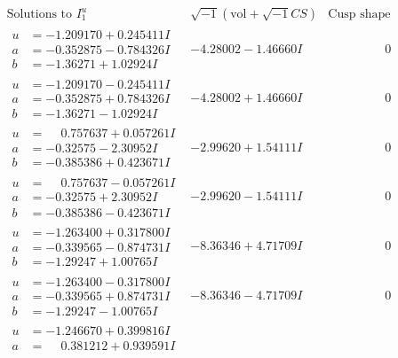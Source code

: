 \documentclass[1p]{elsarticle_modified}
\theoremstyle{definition}
\newcommand{\I}{\sqrt{-1}}
\begin{document}
$$\begin{array}{c|c|c}
\text{Solutions to }I^u_{1}& \I (\text{vol} + \sqrt{-1}CS) & \text{Cusp shape}\\
 \hline 
\begin{aligned}
u &= -1.209170 + 0.245411 I \\
a &= -0.352875 - 0.784326 I \\
b &= -1.36271 + 1.02924 I\end{aligned}
 & -4.28002 - 1.46660 I & \phantom{-0.000000 } 0 \\ \hline\begin{aligned}
u &= -1.209170 - 0.245411 I \\
a &= -0.352875 + 0.784326 I \\
b &= -1.36271 - 1.02924 I\end{aligned}
 & -4.28002 + 1.46660 I & \phantom{-0.000000 } 0 \\ \hline\begin{aligned}
u &= \phantom{-}0.757637 + 0.057261 I \\
a &= -0.32575 - 2.30952 I \\
b &= -0.385386 + 0.423671 I\end{aligned}
 & -2.99620 + 1.54111 I & \phantom{-0.000000 } 0 \\ \hline\begin{aligned}
u &= \phantom{-}0.757637 - 0.057261 I \\
a &= -0.32575 + 2.30952 I \\
b &= -0.385386 - 0.423671 I\end{aligned}
 & -2.99620 - 1.54111 I & \phantom{-0.000000 } 0 \\ \hline\begin{aligned}
u &= -1.263400 + 0.317800 I \\
a &= -0.339565 - 0.874731 I \\
b &= -1.29247 + 1.00765 I\end{aligned}
 & -8.36346 + 4.71709 I & \phantom{-0.000000 } 0 \\ \hline\begin{aligned}
u &= -1.263400 - 0.317800 I \\
a &= -0.339565 + 0.874731 I \\
b &= -1.29247 - 1.00765 I\end{aligned}
 & -8.36346 - 4.71709 I & \phantom{-0.000000 } 0 \\ \hline\begin{aligned}
u &= -1.246670 + 0.399816 I \\
a &= \phantom{-}0.381212 + 0.939591 I \\

\end{aligned}
\end{array}$$
\end{document}
